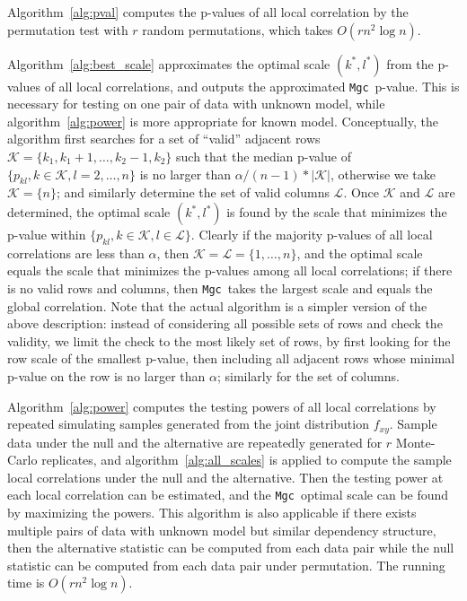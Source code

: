 \documentclass[11pt]{article}
\providecommand{\sct}[1]{{\sc \texttt{#1}}}
\newcommand{\K}{\mathcal{K}}
\newcommand{\LL}{\mathcal{L}}
\newcommand{\Mgc}{\sct{Mgc}}
\begin{document}
Algorithm~\ref{alg:pval} computes the p-values of all local correlation by the permutation test with $r$ random permutations, which takes $O(rn^2 \log n)$.

Algorithm~\ref{alg:best_scale} approximates the optimal scale $(k^{*},l^{*})$ from the p-values of all local correlations, and outputs the approximated \Mgc~p-value. This is necessary for testing on one pair of data with unknown model, while algorithm~\ref{alg:power} is more appropriate for known model. Conceptually, the algorithm first searches for a set of ``valid'' adjacent rows $\K=\{k_{1},k_{1}+1,\ldots,k_{2}-1,k_{2}\}$ such that the median p-value of $\{p_{kl},k \in \K, l=2,\ldots,n\}$
is no larger than $\alpha /(n-1) * |\K|$, otherwise we take $\K=\{n\}$; and similarly determine the set of valid columns $\LL$. Once $\K$ and $\LL$ are determined, the optimal scale $(k^{*},l^{*})$ is found by the scale that minimizes the p-value within $\{p_{kl},k \in \K, l \in \LL\}$. Clearly if the majority p-values of all local correlations are less than $\alpha$, then $\K=\LL=\{1,\ldots,n\}$, and the optimal scale equals the scale that minimizes the p-values among all local correlations; if there is no valid rows and columns, then \Mgc~takes the largest scale and equals the global correlation. Note that the actual algorithm is a simpler version of the above description: instead of considering all possible sets of rows and check the validity, we limit the check to the most likely set of rows, by first looking for the row scale of the smallest p-value, then including all adjacent rows whose minimal p-value on the row is no larger than $\alpha$; similarly for the set of columns.

Algorithm~\ref{alg:power} computes the testing powers of all local correlations by repeated simulating samples generated from the joint distribution $f_{xy}$. Sample data under the null and the alternative are repeatedly generated for $r$ Monte-Carlo replicates, and algorithm~\ref{alg:all_scales} is applied to compute the sample local correlations under the null and the alternative. Then the testing power at each local correlation can be estimated, and the \Mgc~optimal scale can be found by maximizing the powers. This algorithm is also applicable if there exists multiple pairs of data with unknown model but similar dependency structure, then the alternative statistic can be computed from each data pair while the null statistic can be computed from each data pair under permutation. The running time is $O(rn^2 \log n)$.
\end{document}
